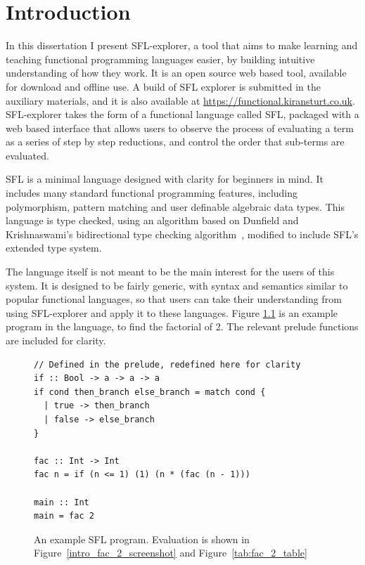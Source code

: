 \chapter{Introduction}
\label{chap:context}
In this dissertation I present SFL-explorer, a tool that aims to make learning and teaching functional programming languages easier, by building intuitive understanding of how they work. It is an open source web based tool, available for download and offline use. A build of SFL explorer is submitted in the auxiliary materials, and it is also available at \href{https://functional.kiransturt.co.uk}{https://functional.kiransturt.co.uk}. 
SFL-explorer takes the form of a functional language called \ac{SFL}, packaged with a web based interface that allows users to observe the process of evaluating a term as a series of step by step reductions, and control the order that sub-terms are evaluated. 


\ac{SFL} is a minimal language designed with clarity for beginners in mind. It includes many standard functional programming features, including polymorphism, pattern matching and user definable algebraic data types. This language is type checked, using an algorithm based on Dunfield and Krishnaswami's bidirectional type checking algorithm~\cite{completebidir}, modified to include \ac{SFL}'s extended type system. 

The language itself is not meant to be the main interest for the users of this system. It is designed to be fairly generic, with syntax and semantics similar to popular functional languages, so that users can take their understanding from using SFL-explorer and apply it to these languages. Figure \ref{tab:fac_2_table_input} is an example program in the language, to find the factorial of 2. The relevant prelude functions are included for clarity.

\begin{figure}[h]
\begin{lstlisting}[language=SFL]
// Defined in the prelude, redefined here for clarity
if :: Bool -> a -> a -> a
if cond then_branch else_branch = match cond {
  | true -> then_branch
  | false -> else_branch
}

fac :: Int -> Int
fac n = if (n <= 1) (1) (n * (fac (n - 1)))

main :: Int
main = fac 2
\end{lstlisting}
\caption{An example SFL program. Evaluation is shown in Figure~\ref{intro_fac_2_screenshot} and Figure~\ref{tab:fac_2_table}}
\label{tab:fac_2_table_input}
\end{figure}


